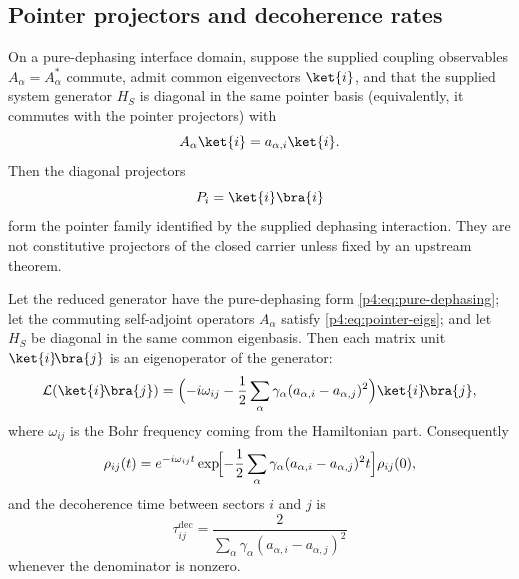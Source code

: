 \documentclass[12pt,a4paper]{article}
\begin{document}
\subsection{Pointer projectors and decoherence rates}
\label{p4:sec:part3-pointer}

On a pure-dephasing interface domain, suppose the supplied coupling observables $A_{\alpha}=A_{\alpha}^*$ commute, admit common eigenvectors $\ket{i}$, and that the supplied system generator $H_S$ is diagonal in the same pointer basis (equivalently, it commutes with the pointer projectors) with
\begin{equation}
\label{p4:eq:pointer-eigs}
A_{\alpha}\ket{i}=a_{\alpha,i}\ket{i}.
\end{equation}
Then the diagonal projectors
\begin{equation}
\label{p4:eq:pointer-projectors}
P_i = \ket{i}\bra{i}
\end{equation}
form the pointer family identified by the supplied dephasing interaction.  They are not constitutive projectors of the closed carrier unless fixed by an upstream theorem.


\begin{proposition}
\label{p4:prop:pure-dephasing-rates}
Let the reduced generator have the pure-dephasing form \eqref{p4:eq:pure-dephasing}; let the commuting self-adjoint operators \(A_\alpha\) satisfy \eqref{p4:eq:pointer-eigs}; and let \(H_S\) be diagonal in the same common eigenbasis.
Then each matrix unit \(\ket{i}\!\bra{j}\) is an eigenoperator of the generator:
\begin{equation}
\label{p4:eq:dephasing-eigenoperator}
\mathcal L(\ket{i}\!\bra{j})
=
\Bigl(
-i\omega_{ij}
-\frac12\sum_\alpha \gamma_\alpha(a_{\alpha,i}-a_{\alpha,j})^2
\Bigr)\ket{i}\!\bra{j},
\end{equation}
where \(\omega_{ij}\) is the Bohr frequency coming from the Hamiltonian part.
Consequently
\begin{equation}
\label{p4:eq:decoh-rate}
\rho_{ij}(t)=e^{-i\omega_{ij}t}\exp\!\Bigl[-\frac12\sum_{\alpha}\gamma_{\alpha}(a_{\alpha,i}-a_{\alpha,j})^2 t\Bigr]\rho_{ij}(0),
\end{equation}
and the decoherence time between sectors \(i\) and \(j\) is
\begin{equation}
\label{p4:eq:decoh-time}
\tau^{\mathrm{dec}}_{ij}
=
\frac{2}{\sum_{\alpha}\gamma_{\alpha}(a_{\alpha,i}-a_{\alpha,j})^2}
\end{equation}
whenever the denominator is nonzero.
\end{proposition}
\end{document}
